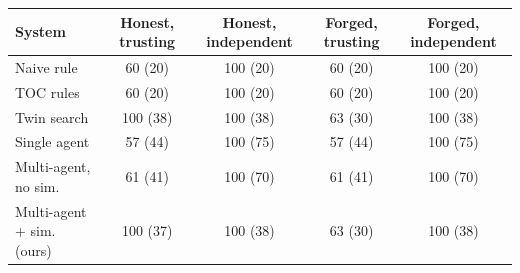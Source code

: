 \begin{tabular}{lcccc}
\toprule
System & Honest, trusting & Honest, independent & Forged, trusting & Forged, independent \\
\midrule
Naive rule & 60 (20) & 100 (20) & 60 (20) & 100 (20) \\
TOC rules & 60 (20) & 100 (20) & 60 (20) & 100 (20) \\
Twin search & 100 (38) & 100 (38) & 63 (30) & 100 (38) \\
Single agent & 57 (44) & 100 (75) & 57 (44) & 100 (75) \\
Multi-agent, no sim. & 61 (41) & 100 (70) & 61 (41) & 100 (70) \\
Multi-agent + sim. (ours) & 100 (37) & 100 (38) & 63 (30) & 100 (38) \\
\bottomrule
\end{tabular}
